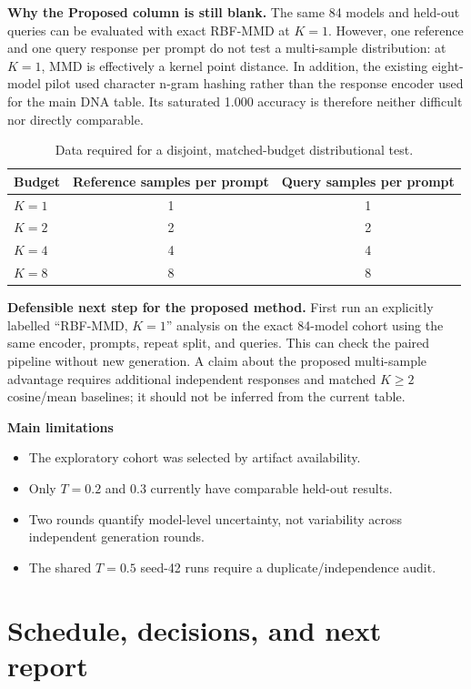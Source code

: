 \documentclass[10pt,a4paper]{article}
\begin{document}
\textbf{Why the Proposed column is still blank.}
The same 84 models and held-out queries can be evaluated with exact RBF-MMD at
$K=1$. However, one reference and one query response per prompt do not test a
multi-sample distribution: at $K=1$, MMD is effectively a kernel point
distance. In addition, the existing eight-model pilot used character
n-gram hashing rather than the response encoder used for the main DNA table.
Its saturated 1.000 accuracy is therefore neither difficult nor directly
comparable.

\begin{table}[h]
\centering
\small
\caption{Data required for a disjoint, matched-budget distributional test.}
\begin{tabular}{lcc}
\toprule
Budget & Reference samples per prompt & Query samples per prompt \\
\midrule
$K=1$ & 1 & 1 \\
$K=2$ & 2 & 2 \\
$K=4$ & 4 & 4 \\
$K=8$ & 8 & 8 \\
\bottomrule
\end{tabular}
\end{table}

\textbf{Defensible next step for the proposed method.}
First run an explicitly labelled ``RBF-MMD, $K=1$'' analysis on the exact
84-model cohort using the same encoder, prompts, repeat split, and queries.
This can check the paired pipeline without new generation. A claim about the
proposed multi-sample advantage requires additional independent responses and
matched $K\geq2$ cosine/mean baselines; it should not be inferred from the
current table.

\textbf{Main limitations}

\begin{itemize}
  \item The exploratory cohort was selected by artifact availability.
  \item Only $T=0.2$ and 0.3 currently have comparable held-out results.
  \item Two rounds quantify model-level uncertainty, not variability across
        independent generation rounds.
  \item The shared $T=0.5$ seed-42 runs require a duplicate/independence audit.
\end{itemize}

\clearpage
\section{Schedule, decisions, and next report}
\end{document}

